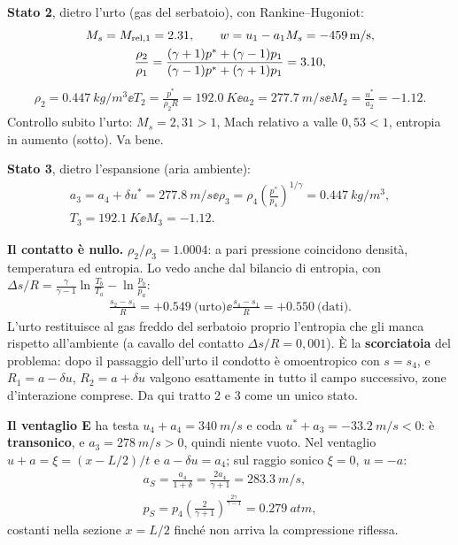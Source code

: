 \textbf{Stato 2}, dietro l'urto (gas del serbatoio), con Rankine--Hugoniot:
\begin{gather*}
  M_s=M_{\rm rel,1}=\num{2.31} ,\qquad w=u_1-a_1M_s=\SI{-459}{m/s},\\
  \frac{\rho_2}{\rho_1}=\frac{(\gamma+1)p^*+(\gamma-1)p_1}{(\gamma-1)p^*+(\gamma+1)p_1}=\num{3.10},
\end{gather*}
\begin{gather*}
  \rho_2=\SI{0.447}{kg/m^3} \ee T_2=\frac{p^*}{\rho_2R}=\SI{192.0}{K} \ee a_2=\SI{277.7}{m/s} \ee
  M_2=\frac{u^*}{a_2}=\num{-1.12}.
\end{gather*}
Controllo subito l'urto: $M_s=2{,}31>1$, Mach relativo a valle $0{,}53<1$, entropia in aumento (sotto). Va bene.

\textbf{Stato 3}, dietro l'espansione (aria ambiente):
\begin{gather*}
  a_3=a_4+\delta u^*=\SI{277.8}{m/s} \ee \rho_3=\rho_4\left(\frac{p^*}{p_4}\right)^{1/\gamma}=\SI{0.447}{kg/m^3},\\
  T_3=\SI{192.1}{K} \ee M_3=\num{-1.12}.
\end{gather*}

\textbf{Il contatto è nullo.} $\rho_2/\rho_3=\num{1.0004}$: a pari pressione coincidono densità, temperatura ed entropia.
Lo vedo anche dal bilancio di entropia, con $\Delta s/R=\frac{\gamma}{\gamma-1}\ln\frac{T_b}{T_a}-\ln\frac{p_b}{p_a}$:
\begin{gather*}
  \frac{s_2-s_1}{R}=+\num{0.549}\ \text{(urto)} \ee \frac{s_4-s_1}{R}=+\num{0.550}\ \text{(dati)}.
\end{gather*}
L'urto restituisce al gas freddo del serbatoio proprio l'entropia che gli manca rispetto all'ambiente (a cavallo del
contatto $\Delta s/R=0{,}001$). È la \textbf{scorciatoia} del problema: dopo il passaggio dell'urto il condotto è
omoentropico con $s=s_4$, e $R_1=a-\delta u$, $R_2=a+\delta u$ valgono esattamente in tutto il campo successivo, zone
d'interazione comprese. Da qui tratto 2 e 3 come un unico stato.

\textbf{Il ventaglio E} ha testa $u_4+a_4=\SI{340}{m/s}$ e coda $u^*+a_3=\SI{-33.2}{m/s}<0$: è \textbf{transonico}, e
$a_3=\SI{278}{m/s}>0$, quindi niente vuoto. Nel ventaglio $u+a=\xi=(x-L/2)/t$ e $a-\delta u=a_4$; sul raggio sonico
$\xi=0$, $u=-a$:
\begin{gather*}
  a_S=\frac{a_4}{1+\delta}=\frac{2a_4}{\gamma+1}=\SI{283.3}{m/s},\\
  p_S=p_4\left(\frac{2}{\gamma+1}\right)^{\frac{2\gamma}{\gamma-1}}=\SI{0.279}{atm},
\end{gather*}
costanti nella sezione $x=L/2$ finché non arriva la compressione riflessa.


